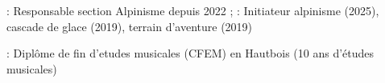 

\begin{cventries}
  \cventry
    {} %
    {} %
    {} %
    {} %
    {
      \begin{cvitems} %
        \item {}: Responsable section Alpinisme depuis 2022 ;  : Initiateur alpinisme (2025), cascade de glace (2019), terrain d'aventure (2019)
        \item {}: Diplôme de fin d'etudes musicales (CFEM) en Hautbois (10 ans d'études musicales)
      \end{cvitems}
    }

\end{cventries}
